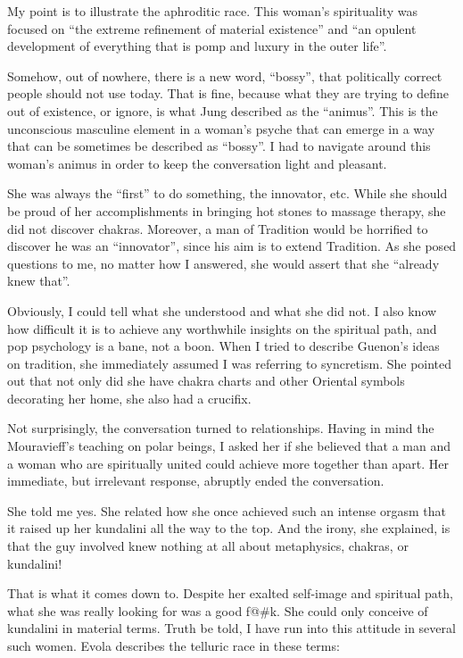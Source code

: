 My point is to illustrate the aphroditic race. This woman's spirituality was focused on ``the extreme refinement of material existence'' and ``an opulent development of everything that is pomp and luxury in the outer life''.

Somehow, out of nowhere, there is a new word, ``bossy'', that politically correct people should not use today. That is fine, because what they are trying to define out of existence, or ignore, is what Jung described as the ``animus''. This is the unconscious masculine element in a woman's psyche that can emerge in a way that can be sometimes be described as ``bossy''. I had to navigate around this woman's animus in order to keep the conversation light and pleasant.

She was always the ``first'' to do something, the innovator, etc. While she should be proud of her accomplishments in bringing hot stones to massage therapy, she did not discover chakras. Moreover, a man of Tradition would be horrified to discover he was an ``innovator'', since his aim is to extend Tradition. As she posed questions to me, no matter how I answered, she would assert that she ``already knew that''.

Obviously, I could tell what she understood and what she did not. I also know how difficult it is to achieve any worthwhile insights on the spiritual path, and pop psychology is a bane, not a boon. When I tried to describe Guenon's ideas on tradition, she immediately assumed I was referring to syncretism. She pointed out that not only did she have chakra charts and other Oriental symbols decorating her home, she also had a crucifix.

Not surprisingly, the conversation turned to relationships. Having in mind the Mouravieff's teaching on polar beings, I asked her if she believed that a man and a woman who are spiritually united could achieve more together than apart. Her immediate, but irrelevant response, abruptly ended the conversation.

She told me yes. She related how she once achieved such an intense orgasm that it raised up her kundalini all the way to the top. And the irony, she explained, is that the guy involved knew nothing at all about metaphysics, chakras, or kundalini!

That is what it comes down to. Despite her exalted self-image and spiritual path, what she was really looking for was a good f@\#k. She could only conceive of kundalini in material terms. Truth be told, I have run into this attitude in several such women. Evola describes the telluric race in these terms:

